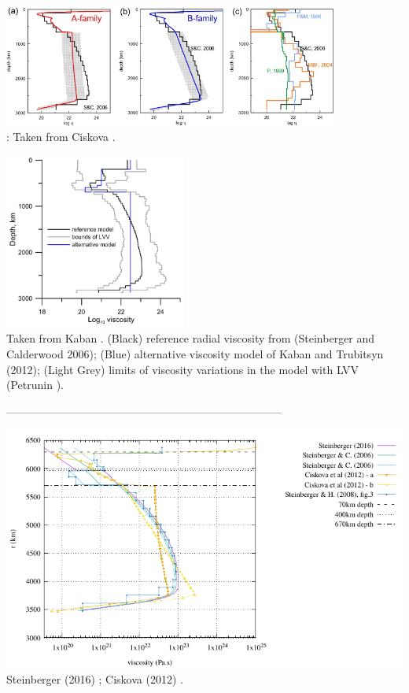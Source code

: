 \begin{center}
\includegraphics[width=11cm]{images/viscosity_profile/civs12-fig1}\\
{\captionfont \twothousandtwelve: Taken from Ciskova \etal \cite{civs12}.}
\end{center}

\begin{center}
\includegraphics[width=6cm]{images/viscosity_profile/kaps14}\\
{\captionfont \twothousandfourteen Taken from Kaban \etal  \cite{kaps14}.
(Black) reference radial viscosity from (Steinberger and Calderwood 2006); 
(Blue) alternative viscosity model of Kaban and Trubitsyn (2012); 
(Light Grey) limits of viscosity variations in the model with LVV (Petrunin ).
}
\end{center}


---------------------------------------------------------------------------

\begin{center}
\includegraphics[width=14cm]{images/viscosity_profile/profiles}\\
{\captionfont Steinberger (2016) \cite{stei16}; 
Ciskova \etal (2012) \cite{civs12}.}
\end{center}


